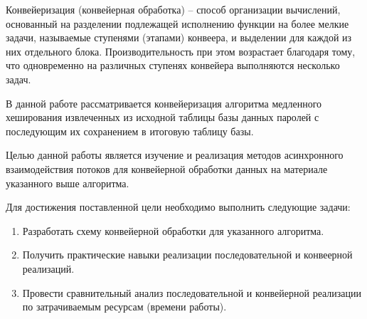 \documentclass[../report.tex]{subfiles}
\begin{document}
Конвейеризация (конвейерная обработка) -- способ организации вычислений, основанный на разделении подлежащей исполнению функции на более мелкие задачи, называемые ступенями (этапами) конвеера, и выделении для каждой из них отдельного блока. Производительность при этом возрастает благодаря тому, что одновременно на различных ступенях конвейера выполняются несколько задач.

В данной работе рассматривается конвейеризация алгоритма медленного хеширования извлеченных из исходной таблицы базы данных паролей с последующим их сохранением в итоговую таблицу базы.

Целью данной работы является изучение и реализация методов асинхронного взаимодействия потоков для конвейерной обработки данных на материале указанного выше алгоритма.

Для достижения поставленной цели необходимо выполнить следующие задачи:
\begin{enumerate}
	\item Разработать схему конвейерной обработки для указанного алгоритма.
	\item Получить практические навыки реализации последовательной и конвеерной реализаций.
	\item Провести сравнительный анализ последовательной и конвейерной реализации по затрачиваемым ресурсам (времени работы).
\end{enumerate}
\end{document}

